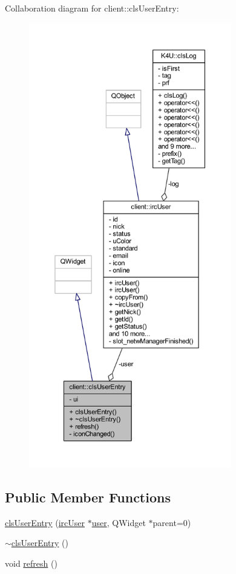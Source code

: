 Collaboration diagram for client\-:\-:cls\-User\-Entry\-:\nopagebreak
\begin{figure}[H]
\begin{center}
\leavevmode
\includegraphics[height=550pt]{de/d34/classclient_1_1cls_user_entry__coll__graph}
\end{center}
\end{figure}
\subsection*{Public Member Functions}
\begin{DoxyCompactItemize}
\item 
\hyperlink{classclient_1_1cls_user_entry_a906da840f42f13d4a0f398c8c5ad6da6}{cls\-User\-Entry} (\hyperlink{classclient_1_1irc_user}{irc\-User} $\ast$\hyperlink{classclient_1_1cls_user_entry_a17a901ba37f7a81041453cc9135f2d4c}{user}, Q\-Widget $\ast$parent=0)
\item 
\hyperlink{classclient_1_1cls_user_entry_ab52b88e70ae687236c85c5f5daebb0ea}{$\sim$cls\-User\-Entry} ()
\item 
void \hyperlink{classclient_1_1cls_user_entry_a878c280a93fabf2651880629103e1ef3}{refresh} ()
\end{DoxyCompactItemize}
